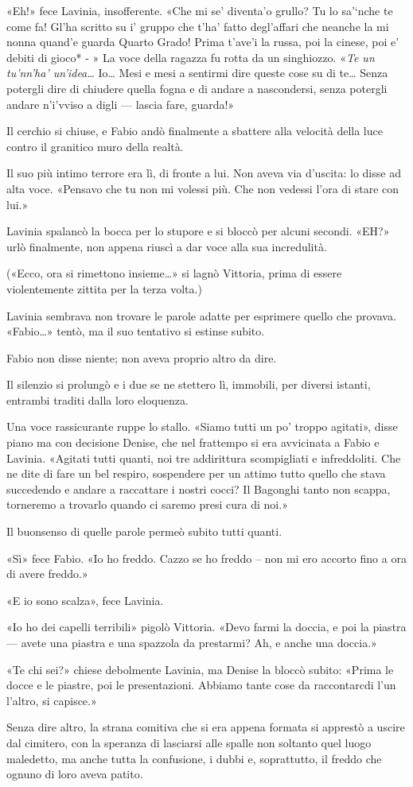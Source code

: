 «Eh!» fece Lavinia, insofferente. «Che mi se' diventa'o grullo? Tu lo sa'`nche te come fa! Gl'ha scritto su i' gruppo che t'ha' fatto degl'affari che neanche la mi nonna quand'e guarda Quarto Grado! Prima t'ave'i la russa, poi la cinese, poi e' debiti di gioco* - » La voce della ragazza fu rotta da un singhiozzo. «\emph{Te un tu'nn'ha' un'idea\ldots{}} Io\ldots{} Mesi e mesi a sentirmi dire queste cose su di te\ldots{} Senza potergli dire di chiudere quella fogna e di andare a nascondersi, senza potergli andare n'i'vviso a digli --- lascia fare, guarda!»

Il cerchio si chiuse, e Fabio andò finalmente a sbattere alla velocità della luce contro il granitico muro della realtà.

Il suo più intimo terrore era lì, di fronte a lui. Non aveva via d'uscita: lo disse ad alta voce. «Pensavo che tu non mi volessi più. Che non vedessi l'ora di stare con lui.»

Lavinia spalancò la bocca per lo stupore e si bloccò per alcuni secondi. «EH?» urlò finalmente, non appena riuscì a dar voce alla sua incredulità.

(«Ecco, ora si rimettono insieme\ldots{}» si lagnò Vittoria, prima di essere violentemente zittita per la terza volta.)

Lavinia sembrava non trovare le parole adatte per esprimere quello che provava. «Fabio\ldots{}» tentò, ma il suo tentativo si estinse subito.

Fabio non disse niente; non aveva proprio altro da dire.

Il silenzio si prolungò e i due se ne stettero lì, immobili, per diversi istanti, entrambi traditi dalla loro eloquenza.

Una voce rassicurante ruppe lo stallo. «Siamo tutti un po' troppo agitati», disse piano ma con decisione Denise, che nel frattempo si era avvicinata a Fabio e Lavinia. «Agitati tutti quanti, noi tre addirittura scompigliati e infreddoliti. Che ne dite di fare un bel respiro, sospendere per un attimo tutto quello che stava succedendo e andare a raccattare i nostri cocci? Il Bagonghi tanto non scappa, torneremo a trovarlo quando ci saremo presi cura di noi.»

Il buonsenso di quelle parole permeò subito tutti quanti.

«Sì» fece Fabio. «Io ho freddo. Cazzo se ho freddo -- non mi ero accorto fino a ora di avere freddo.»

«E io sono scalza», fece Lavinia.

«Io ho dei capelli terribili» pigolò Vittoria. «Devo farmi la doccia, e poi la piastra --- avete una piastra e una spazzola da prestarmi? Ah, e anche una doccia.»

«Te chi sei?» chiese debolmente Lavinia, ma Denise la bloccò subito: «Prima le docce e le piastre, poi le presentazioni. Abbiamo tante cose da raccontarcdi l'un l'altro, si capisce.»

Senza dire altro, la strana comitiva che si era appena formata si apprestò a uscire dal cimitero, con la speranza di lasciarsi alle spalle non soltanto quel luogo maledetto, ma anche tutta la confusione, i dubbi e, soprattutto, il freddo che ognuno di loro aveva patito.
